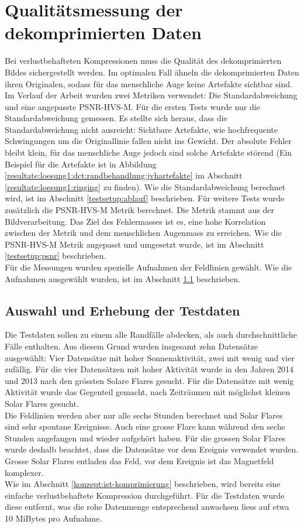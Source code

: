 \section{Qualitätsmessung der dekomprimierten Daten}
Bei verlustbehafteten Kompressionen muss die Qualität des dekomprimierten Bildes sichergestellt werden. Im optimalen Fall ähneln die dekomprimierten Daten ihren Originalen, sodass für das menschliche Auge keine Artefakte sichtbar sind.\\
Im Verlauf der Arbeit wurden zwei Metriken verwendet: Die Standardabweichung und eine angepasste PSNR-HVS-M. Für die ersten Tests wurde nur die Standardabweichung gemessen. Es stellte sich heraus, dass die Standardabweichung nicht ausreicht: Sichtbare Artefakte, wie hochfrequente Schwingungen um die Originallinie fallen nicht ins Gewicht. Der absolute Fehler bleibt klein, für das menschliche Auge jedoch sind solche Artefakte störend (Ein Beispiel für die Artefakte ist in Abbildung \ref{resultate:loesung1:dct:randbehandlung:jvhartefakte} im Abschnitt \ref{resultate:loesung1:ringing} zu finden). Wie die Standardabweichung berechnet wird, ist im Abschnitt \ref{testsetup:ablauf} beschrieben. Für weitere Tests wurde zusätzlich die PSNR-HVS-M Metrik berechnet. Die Metrik stammt aus der Bildverarbeitung. Das Ziel des Fehlermasses ist es, eine hohe Korrelation zwischen der Metrik und dem menschlichen Augenmass zu erreichen. Wie die PSNR-HVS-M Metrik angepasst und umgesetzt wurde, ist im Abschnitt \ref{testsetup:psnr} beschrieben.\\
Für die Messungen wurden spezielle Aufnahmen der Feldlinien gewählt. Wie die Aufnahmen ausgewählt wurden, ist im Abschnitt \ref{testsetup:auswahl_erhebung} beschrieben.

\subsection{Auswahl und Erhebung der Testdaten}\label{testsetup:auswahl_erhebung}
Die Testdaten sollen zu einem alle Randfälle abdecken, als auch durchschnittliche Fälle enthalten. Aus diesem Grund wurden insgesamt zehn Datensätze ausgewählt: Vier Datensätze mit hoher Sonnenaktivität, zwei mit wenig und vier zufällig. Für die vier Datensätzen mit hoher Aktivität wurde in den Jahren 2014 und 2013 nach den grössten Solare Flares gesucht. Für die Datensätze mit wenig Aktivität wurde das Gegenteil gemacht, nach Zeiträumen mit möglichst kleinen Solar Flares gesucht.\\
Die Feldlinien werden aber nur alle sechs Stunden berechnet und Solar Flares sind sehr spontane Ereignisse. Auch eine grosse Flare kann während den sechs Stunden angefangen und wieder aufgehört haben. Für die grossen Solar Flares wurde deshalb beachtet, dass die Datensätze vor dem Ereignis verwendet wurden. Grosse Solar Flares entladen das Feld, vor dem Ereignis ist das Magnetfeld komplexer.\\
[\baselineskip]
Wie im Abschnitt \ref{konzept:ist-komprimierung} beschrieben, wird bereits eine einfache verlustbehaftete Kompression durchgeführt. Für die Testdaten wurde diese entfernt, was die rohe Datenmenge entsprechend anwachsen liess auf etwa 10 MiBytes pro Aufnahme.

